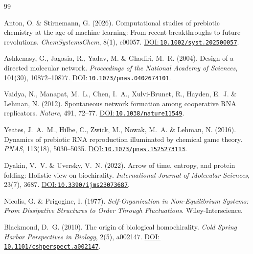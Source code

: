 \documentclass[12pt,a4paper]{article}
\newcommand{\doilink}[1]{\href{https://doi.org/#1}{DOI:\,\nolinkurl{#1}}}
\theoremstyle{remark}
\begin{document}


\begingroup
\small
\setlength{\bibsep}{0.5pt}
\setlength{\itemsep}{0pt}
\setlength{\parskip}{0pt}
\sloppy
\begin{thebibliography}{99}

Anton, O. \& Stirnemann, G. (2026).
\newblock Computational studies of prebiotic chemistry at the age of machine learning: From recent breakthroughs to future revolutions.
\newblock \textit{ChemSystemsChem}, 8(1), e00057.
\newblock \doilink{10.1002/syst.202500057}.

Ashkenasy, G., Jagasia, R., Yadav, M. \& Ghadiri, M.~R. (2004).
\newblock Design of a directed molecular network.
\newblock \textit{Proceedings of the National Academy of Sciences}, 101(30), 10872--10877.
\newblock \doilink{10.1073/pnas.0402674101}.

Vaidya, N., Manapat, M.~L., Chen, I.~A., Xulvi-Brunet, R., Hayden, E.~J. \& Lehman, N. (2012).
\newblock Spontaneous network formation among cooperative RNA replicators.
\newblock \textit{Nature}, 491, 72--77.
\newblock \doilink{10.1038/nature11549}.

Yeates, J.~A.~M., Hilbe, C., Zwick, M., Nowak, M.~A. \& Lehman, N. (2016).
\newblock Dynamics of prebiotic RNA reproduction illuminated by chemical game theory.
\newblock \textit{PNAS}, 113(18), 5030--5035.
\newblock \doilink{10.1073/pnas.1525273113}.

Dyakin, V.~V. \& Uversky, V.~N. (2022).
\newblock Arrow of time, entropy, and protein folding: Holistic view on biochirality.
\newblock \textit{International Journal of Molecular Sciences}, 23(7), 3687.
\newblock \doilink{10.3390/ijms23073687}.

Nicolis, G. \& Prigogine, I. (1977).
\newblock \textit{Self-Organization in Non-Equilibrium Systems: From Dissipative Structures to Order Through Fluctuations}.
\newblock Wiley-Interscience.

Blackmond, D.~G. (2010).
\newblock The origin of biological homochirality.
\newblock \textit{Cold Spring Harbor Perspectives in Biology}, 2(5), a002147.
\newblock \doilink{10.1101/cshperspect.a002147}.


\end{thebibliography}
\end{document}
